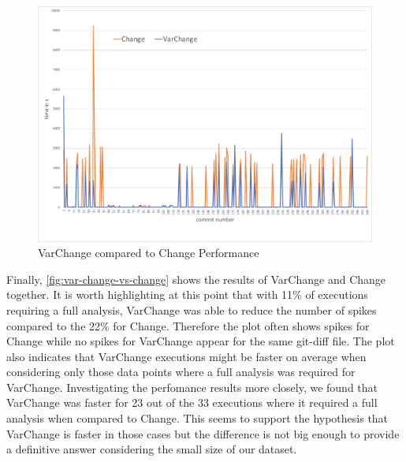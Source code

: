 \documentclass[a4paper]{article}
\begin{document}
\begin{figure}[h] 
  \centering
  \begin{minipage}[b]{1\textwidth} 
    \caption[VarChange compared to Change Performance]{VarChange compared to Change Performance}\label{fig:var-change-vs-change}
    \centering
    \includegraphics[height=1\textwidth, angle=90]{img/var-change-vs-change.pdf}
  \end{minipage}
\end{figure}


Finally, \autoref{fig:var-change-vs-change} shows the results of \textcolor{blue!80!black}{VarChange} and \textcolor{orange!80!black}{Change} together. It is worth highlighting at this point that with 11\% of executions requiring a full analysis, VarChange was able to reduce the number of spikes compared to the 22\% for Change. Therefore the plot often shows spikes for Change while no spikes for VarChange appear for the same git-diff file.
The plot also indicates that VarChange executions might be faster on average when considering only those data points where a full analysis was required for VarChange. Investigating the perfomance results more closely, we found that VarChange was faster for 23 out of the 33 executions where it required a full analysis when compared to Change. This seems to support the hypothesis that VarChange is faster in those cases but the difference is not big enough to provide a definitive answer considering the small size of our dataset.
 
\end{document}

